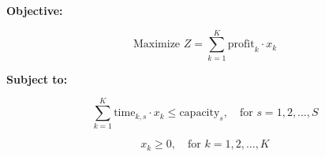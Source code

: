 \documentclass{article}
\begin{document}
\textbf{Objective:}

\[
\text{Maximize } Z = \sum_{k=1}^{K} \text{profit}_{k} \cdot x_k
\]

\textbf{Subject to:}

\[
\sum_{k=1}^{K} \text{time}_{k, s} \cdot x_k \leq \text{capacity}_{s}, \quad \text{for } s = 1, 2, \ldots, S
\]

\[
x_k \geq 0, \quad \text{for } k = 1, 2, \ldots, K
\]
\end{document}
